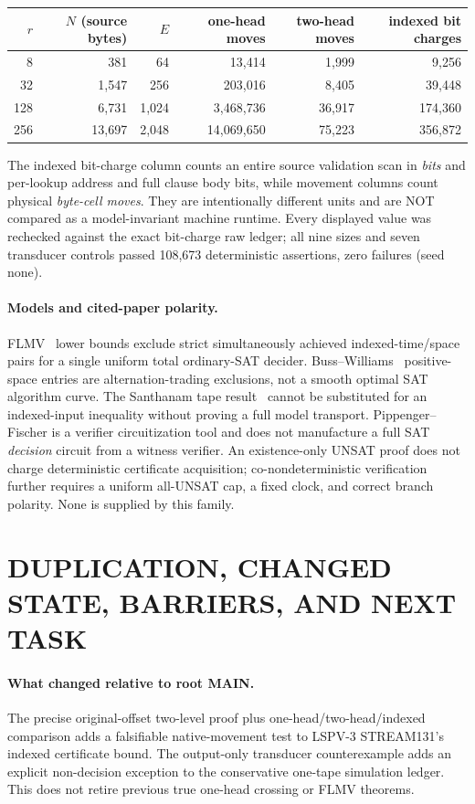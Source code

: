\documentclass[11pt]{article}
\begin{document}
\begin{center}\small\begin{tabular}{rrrrrr}
\toprule
$r$ & $N$ (source bytes) & $E$ & one-head moves & two-head moves & indexed bit charges\\\midrule
8 & 381 & 64 & 13,414 & 1,999 & 9,256\\
32 & 1,547 & 256 & 203,016 & 8,405 & 39,448\\
128 & 6,731 & 1,024 & 3,468,736 & 36,917 & 174,360\\
256 & 13,697 & 2,048 & 14,069,650 & 75,223 & 356,872\\\bottomrule
\end{tabular}\end{center}
\noindent The indexed bit-charge column counts an entire source validation scan in \emph{bits} and per-lookup address and full clause body bits, while movement columns count physical \emph{byte-cell moves}. They are intentionally different units and are NOT compared as a model-invariant machine runtime. Every displayed value was rechecked against the exact bit-charge raw ledger; all nine sizes and seven transducer controls passed 108,673 deterministic assertions, zero failures (seed none).

\paragraph{Models and cited-paper polarity.} FLMV~\cite{flmv} lower bounds exclude strict simultaneously achieved indexed-time/space pairs for a single uniform total ordinary-SAT decider. Buss--Williams~\cite{buss} positive-space entries are alternation-trading exclusions, not a smooth optimal SAT algorithm curve. The Santhanam tape result~\cite{santhanam} cannot be substituted for an indexed-input inequality without proving a full model transport. Pippenger--Fischer is a verifier circuitization tool and does not manufacture a full SAT \emph{decision} circuit from a witness verifier. An existence-only UNSAT proof does not charge deterministic certificate acquisition; co-nondeterministic verification further requires a uniform all-UNSAT cap, a fixed clock, and correct branch polarity. None is supplied by this family.

\section{DUPLICATION, CHANGED STATE, BARRIERS, AND NEXT TASK}
\paragraph{What changed relative to root MAIN.} The precise original-offset two-level proof plus one-head/two-head/indexed comparison adds a falsifiable native-movement test to LSPV-3 STREAM131's indexed certificate bound. The output-only transducer counterexample adds an explicit non-decision exception to the conservative one-tape simulation ledger. This does not retire previous true one-head crossing or FLMV theorems.
\end{document}
